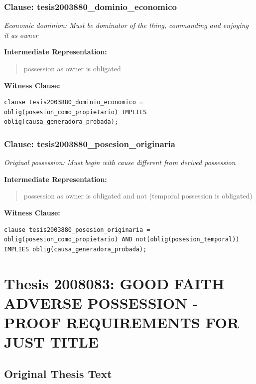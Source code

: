 \documentclass[11pt,a4paper]{article}
\begin{document}
\subsubsection{Clause: tesis2003880\_dominio\_economico}

\textit{Economic dominion: Must be dominator of the thing, commanding and enjoying it as owner}

\textbf{Intermediate Representation:}

\begin{quote}
possession as owner is obligated
\end{quote}

\textbf{Witness Clause:}

\begin{lstlisting}[style=witnessstyle, language=Witness]
clause tesis2003880_dominio_economico = oblig(posesion_como_propietario) IMPLIES oblig(causa_generadora_probada);
\end{lstlisting}

\subsubsection{Clause: tesis2003880\_posesion\_originaria}

\textit{Original possession: Must begin with cause different from derived possession}

\textbf{Intermediate Representation:}

\begin{quote}
possession as owner is obligated and not (temporal possession is obligated)
\end{quote}

\textbf{Witness Clause:}

\begin{lstlisting}[style=witnessstyle, language=Witness]
clause tesis2003880_posesion_originaria = oblig(posesion_como_propietario) AND not(oblig(posesion_temporal)) IMPLIES oblig(causa_generadora_probada);
\end{lstlisting}

\newpage

\section{Thesis 2008083: GOOD FAITH ADVERSE POSSESSION - PROOF REQUIREMENTS FOR JUST TITLE}
\label{thesis:2008083}

\subsection{Original Thesis Text}
\end{document}
